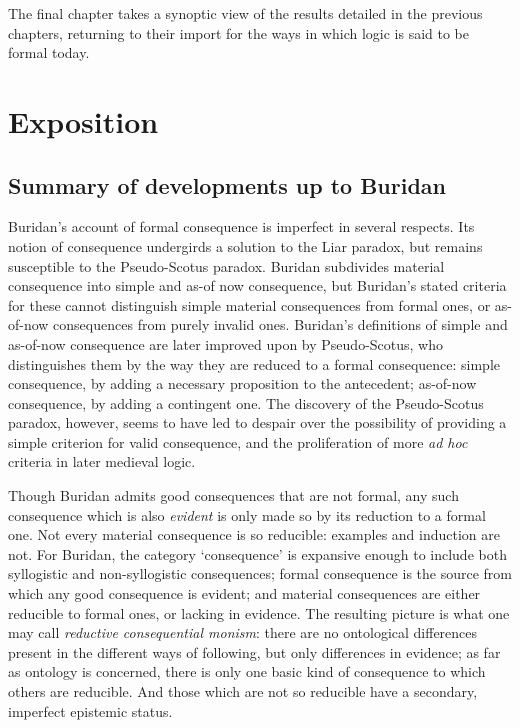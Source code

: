 \documentclass[]{article}
\begin{document}

The final chapter takes a synoptic view of the results detailed in the previous chapters, returning to their import for the ways in which logic is said to be formal today.
		\section{Exposition}
		\subsection{Summary of developments up to Buridan}				
		Buridan's account of formal consequence is imperfect in several respects. Its notion of consequence undergirds a solution to the Liar paradox, but remains susceptible to the Pseudo-Scotus paradox. Buridan subdivides material consequence into simple and as-of now consequence, but Buridan's stated criteria for these cannot distinguish simple material consequences from formal ones, or as-of-now consequences from purely invalid ones. Buridan's definitions of simple and as-of-now consequence are later improved upon by Pseudo-Scotus, who distinguishes them by the way they are reduced to a formal consequence: simple consequence, by adding a necessary proposition to the antecedent; as-of-now consequence, by adding a contingent one. The discovery of the Pseudo-Scotus paradox, however, seems to have led to despair over the possibility of providing a simple criterion for valid consequence, and the proliferation of more \textit{ad hoc} criteria in later medieval logic.
		
		Though Buridan admits good consequences that are not formal, any such consequence which is also \textit{evident} is only made so by its reduction to a formal one. Not every material consequence is so reducible: examples and induction are not. For Buridan, the category `consequence' is expansive enough to include both syllogistic and non-syllogistic consequences; formal consequence is the source from which any good consequence is evident; and material consequences are either reducible to formal ones, or lacking in evidence. The resulting picture is what one may call \textit{reductive consequential monism}: there are no ontological differences present in the different ways of following, but only differences in evidence; as far as ontology is concerned, there is only one basic kind of consequence to which others are reducible. And those which are not so reducible have a secondary, imperfect epistemic status.
		
\end{document}

